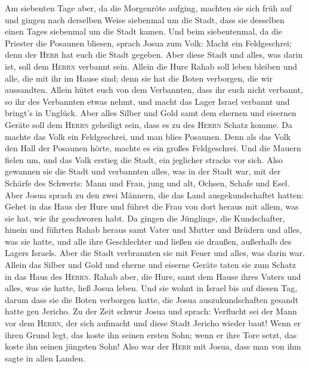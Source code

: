  Am siebenten Tage aber, da die Morgenröte aufging,
machten sie sich früh auf und gingen nach derselben Weise siebenmal um
die Stadt, dass sie desselben einen Tages siebenmal um die Stadt kamen.
 Und beim siebentenmal, da die Priester die Posaunen
bliesen, sprach Josua zum Volk: Macht ein Feldgeschrei; denn der
\textsc{Herr} hat euch die Stadt gegeben.  Aber diese
Stadt und alles, was darin ist, soll dem \textsc{Herrn} verbannt sein.
Allein die Hure Rahab soll leben bleiben und alle, die mit ihr im Hause
sind; denn sie hat die Boten verborgen, die wir aussandten.
 Allein hütet euch von dem Verbannten, dass ihr euch
nicht verbannt, so ihr des Verbannten etwas nehmt, und macht das Lager
Israel verbannt und bringt's in Unglück.  Aber alles
Silber und Gold samt dem ehernen und eisernen Geräte soll dem
\textsc{Herrn} geheiligt sein, dass es zu des \textsc{Herrn} Schatz
komme.  Da machte das Volk ein Feldgeschrei, und man
blies Posaunen. Denn als das Volk den Hall der Posaunen hörte, machte es
ein großes Feldgeschrei. Und die Mauern fielen um, und das Volk erstieg
die Stadt, ein jeglicher stracks vor sich. Also gewannen sie die Stadt
 und verbannten alles, was in der Stadt war, mit der
Schärfe des Schwerts: Mann und Frau, jung und alt, Ochsen, Schafe und
Esel.  Aber Josua sprach zu den zwei Männern, die das
Land ausgekundschaftet hatten: Gehet in das Haus der Hure und führet die
Frau von dort heraus mit allem, was sie hat, wie ihr geschworen habt.
 Da gingen die Jünglinge, die Kundschafter, hinein und
führten Rahab heraus samt Vater und Mutter und Brüdern und alles, was
sie hatte, und alle ihre Geschlechter und ließen sie draußen, außerhalb
des Lagers Israels.  Aber die Stadt verbrannten sie mit
Feuer und alles, was darin war. Allein das Silber und Gold und eherne
und eiserne Geräte taten sie zum Schatz in das Haus des \textsc{Herrn}.
 Rahab aber, die Hure, samt dem Hause ihres Vaters und
alles, was sie hatte, ließ Josua leben. Und sie wohnt in Israel bis auf
diesen Tag, darum dass sie die Boten verborgen hatte, die Josua
auszukundschaften gesandt hatte gen Jericho.  Zu der Zeit
schwur Josua und sprach: Verflucht sei der Mann vor dem \textsc{Herrn},
der sich aufmacht und diese Stadt Jericho wieder baut! Wenn er ihren
Grund legt, das koste ihn seinen ersten Sohn; wenn er ihre Tore setzt,
das koste ihn seinen jüngsten Sohn!  Also war der
\textsc{Herr} mit Josua, dass man von ihm sagte in allen Landen.

